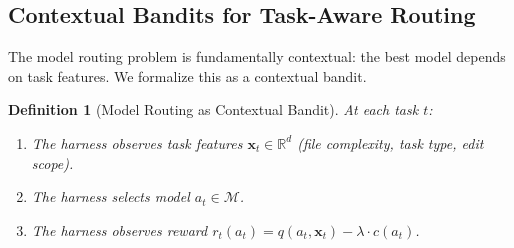 \documentclass[11pt, a4paper, copyright]{googledeepmind}
\newtheorem{definition}{Definition}[section]
\begin{document}
\subsection{Contextual Bandits for Task-Aware Routing}

The model routing problem is fundamentally contextual: the best model depends on task features. We formalize this as a contextual bandit.

\begin{definition}[Model Routing as Contextual Bandit]
At each task $t$:
\begin{enumerate}
\item The harness observes task features $\mathbf{x}_t \in \mathbb{R}^d$ (file complexity, task type, edit scope).
\item The harness selects model $a_t \in \mathcal{M}$.
\item The harness observes reward $r_t(a_t) = q(a_t, \mathbf{x}_t) - \lambda \cdot c(a_t)$.
\end{enumerate}
\end{definition}
\end{document}
